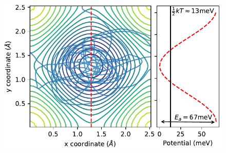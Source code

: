 \documentclass[7pt]{article}
\begin{document}
\begin{figure}
	\centering
	\includegraphics{pot_surface}
	\caption{}
	\label{pot_surface}
\end{figure}


\end{document}
